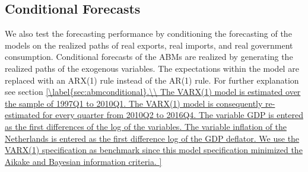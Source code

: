 \subsection{Conditional Forecasts}
We also test the forecasting performance by conditioning the forecasting of the models on the realized paths of real exports, real imports, and real government consumption. Conditional forecasts of the ABMs are realized by generating the realized paths of the exogenous variables. The expectations within the model are replaced with an ARX(1) rule instead of the AR(1) rule. For further explanation see section \ref{\label{sec:abmconditional}.\\ 

The VARX(1) model is estimated over the sample of 1997Q1 to 2010Q1. The VARX(1) model is consequently re-estimated for every quarter from 2010Q2 to 2016Q4. The variable GDP is entered as the first differences of the log of the variables. The variable inflation of the Netherlands is entered as the first difference log of the GDP deflator. We use the VARX(1) specification as benchmark since this model specification minimized the Aikake and Bayesian information criteria. 

}

